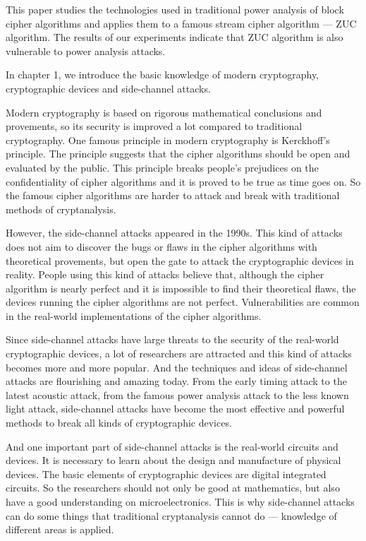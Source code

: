 \begin{bigabstract} %
This paper studies the technologies used in traditional power analysis of block cipher algorithms and applies them to a famous stream cipher algorithm --- ZUC algorithm. The results of our experiments indicate that ZUC algorithm is also vulnerable to power analysis attacks.

In chapter 1, we introduce the basic knowledge of modern cryptography, cryptographic devices and side-channel attacks. 

Modern cryptography is based on rigorous mathematical conclusions and provements, so its security is improved a lot compared to traditional cryptography. One famous principle in modern cryptography is Kerckhoff's principle. The principle suggests that the cipher algorithms should be open and evaluated by the public. This principle breaks people's prejudices on the confidentiality of cipher algorithms and it is proved to be true as time goes on. So the famous cipher algorithms are harder to attack and break with traditional methods of cryptanalysis.

However, the side-channel attacks appeared in the 1990s. This kind of attacks does not aim to discover the bugs or flaws in the cipher algorithms with theoretical provements, but open the gate to attack the cryptographic devices in reality. People using this kind of attacks believe that, although the cipher algorithm is nearly perfect and it is impossible to find their theoretical flaws, the devices running the cipher algorithms are not perfect. Vulnerabilities are common in the real-world implementations of the cipher algorithms.

Since side-channel attacks have large threats to the security of the real-world cryptographic devices, a lot of researchers are attracted and this kind of attacks becomes more and more popular. And the techniques and ideas of side-channel attacks are flourishing and amazing today. From the early timing attack to the latest acoustic attack, from the famous power analysis attack to the less known light attack, side-channel attacks have become the most effective and powerful methods to break all kinds of cryptographic devices.

And one important part of side-channel attacks is the real-world circuits and devices. It is necessary to learn about the design and manufacture of physical devices. The basic elements of cryptographic devices are digital integrated circuits. So the researchers should not only be good at mathematics, but also have a good understanding on microelectronics. This is why side-channel attacks can do some things that traditional cryptanalysis cannot do --- knowledge of different areas is applied.


\end{bigabstract}
